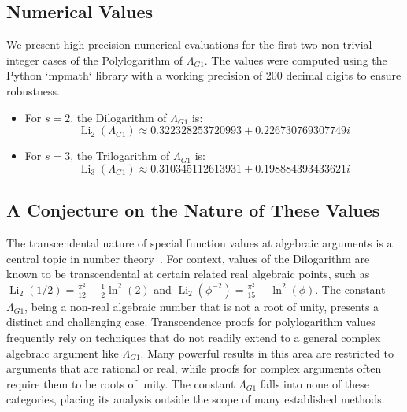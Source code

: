 \documentclass{amsart}
\theoremstyle{plain}
\theoremstyle{definition}
\theoremstyle{remark}
\DeclareMathOperator{\Li}{Li} %
\newcommand{\LambdaG}{\Lambda_{G1}}
\newcommand{\phiG}{\phi}
\begin{document}
\subsection{Numerical Values}
We present high-precision numerical evaluations for the first two non-trivial integer cases of the Polylogarithm of $\LambdaG$. The values were computed using the Python `mpmath` library with a working precision of 200 decimal digits to ensure robustness.
\begin{itemize}
    \item For $s=2$, the Dilogarithm of $\LambdaG$ is:
    \[ \Li_2(\LambdaG) \approx 0.322328253720993 + 0.226730769307749i \]
    
    \item For $s=3$, the Trilogarithm of $\LambdaG$ is:
    \[ \Li_3(\LambdaG) \approx 0.310345112613931 + 0.198884393433621i \]
    
\end{itemize}

\subsection{A Conjecture on the Nature of These Values}
The transcendental nature of special function values at algebraic arguments is a central topic in number theory~\cite{Baker}. For context, values of the Dilogarithm are known to be transcendental at certain related real algebraic points, such as $\Li_2(1/2) = \frac{\pi^2}{12} - \frac{1}{2}\ln^2(2)$ and $\Li_2(\phiG^{-2}) = \frac{\pi^2}{15} - \ln^2(\phiG)$. The constant $\LambdaG$, being a non-real algebraic number that is not a root of unity, presents a distinct and challenging case. Transcendence proofs for polylogarithm values frequently rely on techniques that do not readily extend to a general complex algebraic argument like $\LambdaG$. Many powerful results in this area are restricted to arguments that are rational or real, while proofs for complex arguments often require them to be roots of unity. The constant $\LambdaG$ falls into none of these categories, placing its analysis outside the scope of many established methods.
\end{document}

